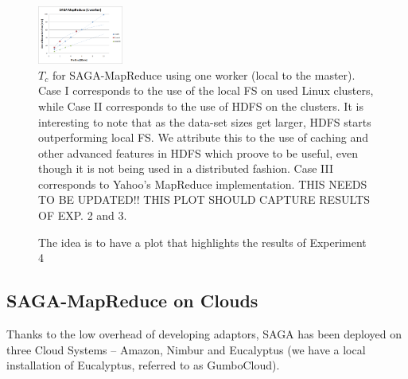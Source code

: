 \documentclass[conference,final]{IEEEtran}
\newcommand{\jhanote}[1]{ {\textcolor{red} { ***SJ: #1 }}}
\newcommand{\jhanote}[1]{}
\newcommand{\sagamapreduce }{SAGA-MapReduce }
\newcommand{\tc }{ $T_c$ }
\begin{document}

\begin{figure}[t]
      \centering
          \includegraphics[width=0.25\textwidth]{saga_mapreduce_1worker.png}
          \caption{\tc for \sagamapreduce using one worker (local to
            the master).  Case I corresponds to the use of the local
            FS on used Linux clusters, while Case II corresponds to
            the use of HDFS on the clusters.  It is interesting to
            note that as the data-set sizes get larger, HDFS starts
            outperforming local FS.  We attribute this to the use of
            caching and other advanced features in HDFS which proove
            to be useful, even though it is not being used in a
            distributed fashion. Case III
            corresponds %
            to Yahoo's MapReduce implementation. THIS NEEDS TO BE
            UPDATED!! THIS PLOT SHOULD CAPTURE RESULTS OF EXP. 2 and
            3.} %

      \label{saga_mapreduce_1worker.png}
\end{figure}

\begin{figure}[t]
      \centering
          \caption{The idea is to have a plot that highlights the results of Experiment 4}
      \label{saga_mapreduce_3workers.png}
\end{figure}

\subsection{SAGA-MapReduce on Clouds}

Thanks to the low overhead of developing adaptors, SAGA has been deployed
on  three Cloud Systems -- Amazon, Nimbur and Eucalyptus (we have a local
installation of Eucalyptus, referred to as GumboCloud).
\end{document}
